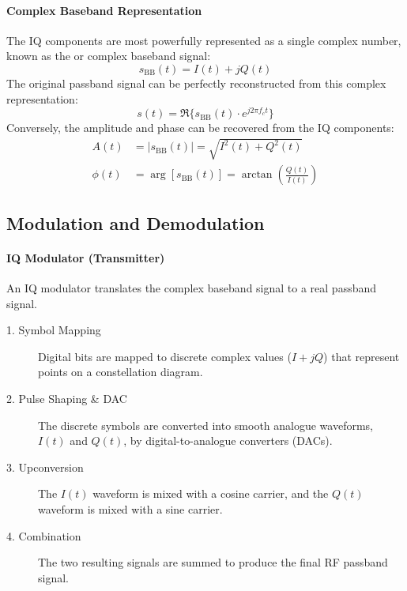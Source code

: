 \paragraph{Complex Baseband Representation}
The IQ components are most powerfully represented as a single complex number, known as the  or complex baseband signal:
\begin{equation}
    s_{\text{BB}}(t) = I(t) + jQ(t)
\end{equation}
The original passband signal can be perfectly reconstructed from this complex representation:
\begin{equation}
    s(t) = \Re\{s_{\text{BB}}(t) \cdot e^{j2\pi f_c t}\}
\end{equation}
Conversely, the amplitude and phase can be recovered from the IQ components:
\begin{align}
    A(t) &= |s_{\text{BB}}(t)| = \sqrt{I^2(t) + Q^2(t)} \\
    \phi(t) &= \arg[s_{\text{BB}}(t)] = \arctan\left(\frac{Q(t)}{I(t)}\right)
\end{align}

\subsection{Modulation and Demodulation}

\paragraph{IQ Modulator (Transmitter)}
An IQ modulator translates the complex baseband signal to a real passband signal.
\begin{description}
    \item[1. Symbol Mapping] Digital bits are mapped to discrete complex values ($I+jQ$) that represent points on a constellation diagram.
    \item[2. Pulse Shaping \& DAC] The discrete symbols are converted into smooth analogue waveforms, $I(t)$ and $Q(t)$, by digital-to-analogue converters (DACs).
    \item[3. Upconversion] The $I(t)$ waveform is mixed with a cosine carrier, and the $Q(t)$ waveform is mixed with a sine carrier.
    \item[4. Combination] The two resulting signals are summed to produce the final RF passband signal.
\end{description}

